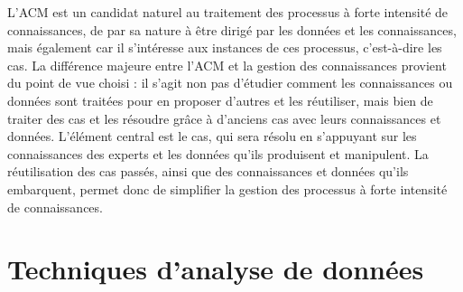 \bigskip

L'ACM est un candidat naturel au traitement des processus à forte intensité de connaissances, de par sa nature à être dirigé par les données et les connaissances, mais également car il s'intéresse aux instances de ces processus, c'est-à-dire les cas.
La différence majeure entre l'ACM et la gestion des connaissances provient du point de vue choisi : il s'agit non pas d'étudier comment les connaissances ou données sont traitées pour en proposer d'autres et les réutiliser, mais bien de traiter des cas et les résoudre grâce à d'anciens cas avec leurs connaissances et données.
L'élément central est le cas, qui sera résolu en s'appuyant sur les connaissances des experts et les données qu'ils produisent et manipulent.
La réutilisation des cas passés, ainsi que des connaissances et données qu'ils embarquent, permet donc de simplifier la gestion des processus à forte intensité de connaissances.






\clearpage %
\newpage   %



\section{Techniques d'analyse de données}
\label{section:Contexte:TechniquesAnalyseDonnees}

